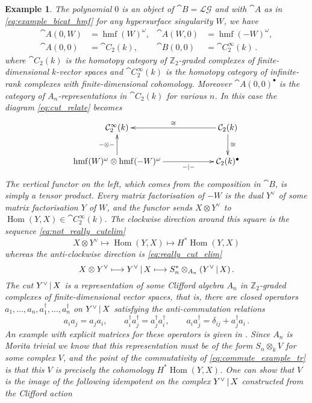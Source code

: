 \documentclass[english,letter paper,12pt,reqno]{article}
\theoremstyle{example}
\newtheorem{example}[theorem]{Example}
\numberwithin{equation}{section}
\def\LG{\mathcal{LG}}
\def\Hom{\operatorname{Hom}}
\DeclareMathOperator{\hmf}{hmf}
\begin{document}
\begin{example}\label{example:cut_system_hom} The polynomial $0$ is an object of $\cat{B} = \LG$ and with $\cat{A}$ as in \eqref{eq:example_bicat_hmf} for any hypersurface singularity $W$, we have
\begin{align*}
\cat{A}(0, W) &= \hmf(W)^\omega, & \cat{A}(W,0) &= \hmf(-W)^\omega,\\
\cat{A}(0,0) &= \cat{C}_2( k ), & \cat{B}(0,0) &= \cat{C}^\infty_2(k)\,.
\end{align*}
where $\cat{C}_2(k)$ is the homotopy category of $\mathbb{Z}_2$-graded complexes of finite-dimensional $k$-vector spaces and $\cat{C}^\infty_2(k)$ is the homotopy category of infinite-rank complexes with finite-dimensional cohomology. Moreover $\cat{A}(0,0)^\bullet$ is the category of $A_n$-representations in $\cat{C}_2(k)$ for various $n$. In this case the diagram \eqref{eq:cut_relate} becomes
\begin{equation}\label{eq:commute_example_tr}
\xymatrix@C+3pc{
\cat{C}_2^\infty(k) & \cat{C}_2(k) \ar[l]_-{\cong} \ar[d]^-{\cong}\\
\hmf(W)^\omega \otimes \hmf(-W)^\omega \ar[u]^-{- \otimes -}\ar[r]_-{-|-} & \cat{C}_2(k)^\bullet
}
\end{equation}
The vertical functor on the left, which comes from the composition in $\cat{B}$, is simply a tensor product. Every matrix factorisation of $-W$ is the dual $Y^{\vee}$ of some matrix factorisation $Y$ of $W$, and the functor sends $X \otimes Y^{\vee}$ to $\Hom(Y,X) \in \cat{C}_2^\infty(k)$. The clockwise direction around this square is the sequence \eqref{eq:not_really_cutelim}
\[
X \otimes Y^{\vee} \longmapsto \Hom(Y,X) \longmapsto H^* \Hom(Y,X)
\]
whereas the anti-clockwise direction is \eqref{eq:really_cut_elim}
\[
X \otimes Y^{\vee} \longmapsto Y^{\vee} \,|\, X \longmapsto S_n^* \otimes_{A_n} ( Y^{\vee} \,|\, X )\,.
\]
The cut $Y^{\vee} \,|\, X$ is a representation of some Clifford algebra $A_n$ in $\mathbb{Z}_2$-graded complexes of finite-dimensional vector spaces, that is, there are closed operators $a_1,\ldots,a_n,a_1^\dagger,\ldots,a_n^\dagger$ on $Y^{\vee} \,|\, X$ satisfying the anti-commutation relations
\[
a_i a_j = a_j a_i, \qquad a_i^\dagger a_j^\dagger = a_j^\dagger a_i^\dagger, \qquad a_i a_j^\dagger = \delta_{ij} + a_j^\dagger a_i\,.
\]
An example with explicit matrices for these operators is given in \cite[Example 4.15]{murfet}. Since $A_n$ is Morita trivial we know that this representation must be of the form $S_n \otimes_k V$ for some complex $V$, and the point of the commutativity of \eqref{eq:commute_example_tr} is that this $V$ is precisely the cohomology $H^* \Hom(Y,X)$. One can show that $V$ is the image of the following idempotent on the complex $Y^{\vee} \,|\, X$ constructed from the Clifford action \cite[Definition 2.18]{murfet}

\end{example}
\end{document}
